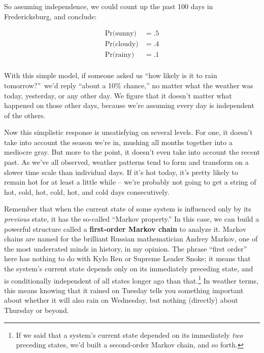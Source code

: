 \begin{alttitles}
So assuming independence, we could count up the past 100 days in
Fredericksburg, and conclude:

\vspace{-.15in}
\begin{align*}
\textrm{Pr(sunny)} &= .5 \\
\textrm{Pr(cloudy)} &= .4 \\
\textrm{Pr(rainy)} &= .1 \\
\end{align*}
\vspace{-.25in}

With this simple model, if someone asked us ``how likely is it to rain
tomorrow?''~we'd reply ``about a 10\% chance,'' no matter what the weather was
today, yesterday, or any other day. We figure that it doesn't matter what
happened on those other days, because we're assuming every day is independent
of the others.

Now this simplistic response is unsatisfying on several levels. For one, it
doesn't take into account the season we're in, mushing all months together into
a mediocre gray. But more to the point, it doesn't even take into account the
recent past. As we've all observed, weather patterns tend to form and transform
on a slower time scale than individual days. If it's hot today, it's pretty
likely to remain hot for at least a little while -- we're probably not going to
get a string of hot, cold, hot, cold, hot, and cold days consecutively.


Remember that when the current state of some system is influenced only by its
\textit{previous} state, it has the so-called ``Markov property.'' In this
case, we can build a powerful structure called a \textbf{first-order Markov
chain} to analyze it. Markov chains are named for the brilliant Russian
mathematician Andrey Markov, one of the most underrated minds in history, in my
opinion. The phrase ``first order'' here has nothing to do with Kylo Ren or
Supreme Leader Snoke; it means that the system's current state depends only on
its immediately preceding state, and is conditionally independent of all states
longer ago than that.\footnote{If we said that a system's current state
depended on its immediately \textit{two} preceding states, we'd built a
second-order Markov chain, and so forth.} In weather terms, this means knowing
that it rained on Tuesday tells you something important about whether it will
also rain on Wednesday, but nothing (directly) about Thursday or beyond.


\end{alttitles}
